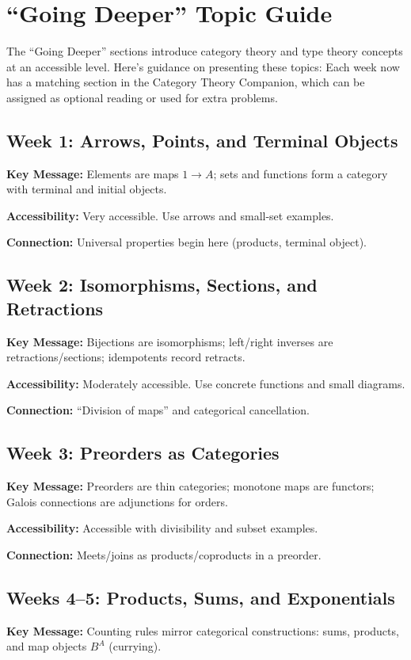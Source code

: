 \documentclass[11pt]{article}
\begin{document}
\newpage
\section{``Going Deeper'' Topic Guide}

The ``Going Deeper'' sections introduce category theory and type theory concepts at an accessible level. Here's guidance on presenting these topics:
Each week now has a matching section in the Category Theory Companion, which can be assigned as optional reading or used for extra problems.

\subsection{Week 1: Arrows, Points, and Terminal Objects}
\textbf{Key Message:} Elements are maps $1 \to A$; sets and functions form a category with terminal and initial objects.

\textbf{Accessibility:} Very accessible. Use arrows and small-set examples.

\textbf{Connection:} Universal properties begin here (products, terminal object).

\subsection{Week 2: Isomorphisms, Sections, and Retractions}
\textbf{Key Message:} Bijections are isomorphisms; left/right inverses are retractions/sections; idempotents record retracts.

\textbf{Accessibility:} Moderately accessible. Use concrete functions and small diagrams.

\textbf{Connection:} ``Division of maps'' and categorical cancellation.

\subsection{Week 3: Preorders as Categories}
\textbf{Key Message:} Preorders are thin categories; monotone maps are functors; Galois connections are adjunctions for orders.

\textbf{Accessibility:} Accessible with divisibility and subset examples.

\textbf{Connection:} Meets/joins as products/coproducts in a preorder.

\subsection{Weeks 4--5: Products, Sums, and Exponentials}
\textbf{Key Message:} Counting rules mirror categorical constructions: sums, products, and map objects $B^A$ (currying).
\end{document}
